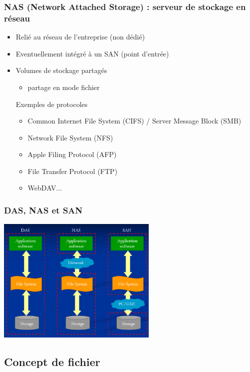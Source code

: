\begin{frame}
  \frametitle{NAS (Network Attached Storage) : serveur de stockage en réseau}
  \begin{itemize}
    \item Relié au réseau de l'entreprise (non dédié)
    \item Eventuellement intégré à un SAN (point d'entrée)
    \item Volumes de stockage partagés
    \begin{itemize}
      \item partage en mode fichier
    \end{itemize}
    \begin{exampleblock}{Exemples de protocoles}
      \begin{itemize}
        \item Common Internet File System (CIFS) / Server Message Block (SMB)
        \item Network File System (NFS)
        \item Apple Filing Protocol (AFP)
        \item File Transfer Protocol (FTP)
        \item WebDAV...
      \end{itemize}
    \end{exampleblock}
  \end{itemize}
\end{frame}

\begin{frame}
  \frametitle{DAS, NAS et SAN \cite{wp-san}}
  \begin{center}
    \includegraphics[height=6cm]{../illustration/DAS_NAS_SAN.png}
  \end{center}
\end{frame}


\subsection{Concept de fichier}

